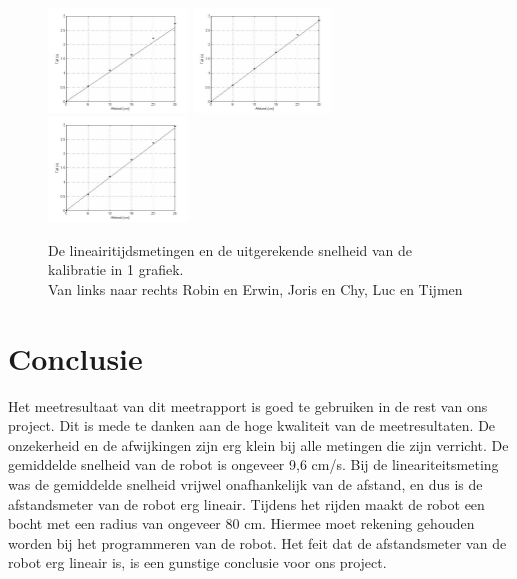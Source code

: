 \documentclass{report}
\begin{document}
\begin{figure}[H]
\includegraphics[width=0.33\textwidth,page=2]{Lineariteitsmeting1}
\includegraphics[width=0.33\textwidth,page=1]{Lineariteitsmeting2}
\includegraphics[width=0.33\textwidth,page=3]{Lineariteitsmeting3}
\caption{De lineairitijdsmetingen en de uitgerekende snelheid van de kalibratie in 1 grafiek. \\ \small{ Van links naar rechts Robin en Erwin, Joris en Chy, Luc en Tijmen}}
\label{fig:measureGraph}
\end{figure}

\newpage
\chapter{Conclusie}
Het meetresultaat van dit meetrapport is goed te gebruiken in de rest van ons project. Dit is mede te danken aan de hoge kwaliteit van de meetresultaten. De onzekerheid en de afwijkingen zijn erg klein bij alle metingen die zijn verricht. De gemiddelde snelheid van de robot is ongeveer 9,6 cm/s. Bij de lineariteitsmeting was de gemiddelde snelheid vrijwel onafhankelijk van de afstand, en dus is de afstandsmeter van de robot erg lineair. Tijdens het rijden maakt de robot een bocht met een radius van ongeveer 80 cm. Hiermee moet rekening gehouden worden bij het programmeren van de robot. Het feit dat de afstandsmeter van de robot erg lineair is, is een gunstige conclusie voor ons project.
\end{document}
